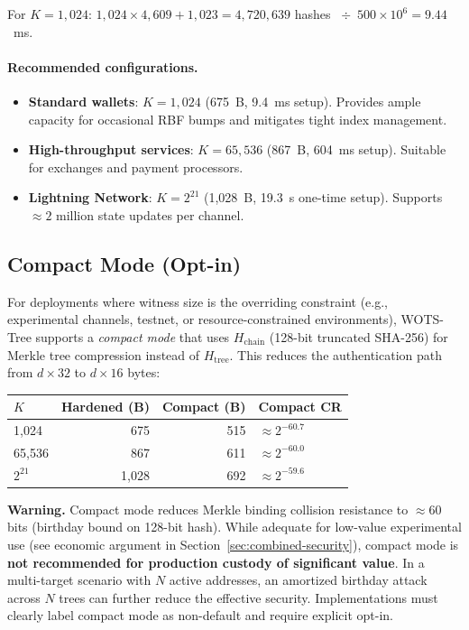 \documentclass[11pt,a4paper]{article}
\theoremstyle{definition}
\begin{document}
For $K = 1{,}024$: $1{,}024 \times 4{,}609 + 1{,}023 = 4{,}720{,}639$ hashes $\;\div\; 500 \times 10^6 = 9.44$~ms.

\paragraph{Recommended configurations.}
\begin{itemize}[nosep]
    \item \textbf{Standard wallets}: $K = 1{,}024$ (675~B, 9.4~ms setup). Provides ample capacity for occasional RBF bumps and mitigates tight index management.
    \item \textbf{High-throughput services}: $K = 65{,}536$ (867~B, 604~ms setup). Suitable for exchanges and payment processors.
    \item \textbf{Lightning Network}: $K = 2^{21}$ (1,028~B, 19.3~s one-time setup). Supports $\approx 2$ million state updates per channel.
\end{itemize}

\subsection{Compact Mode (Opt-in)}
\label{sec:compact-mode}

For deployments where witness size is the overriding constraint (e.g., experimental channels, testnet, or resource-constrained environments), WOTS-Tree supports a \emph{compact mode} that uses $H_{\mathrm{chain}}$ (128-bit truncated SHA-256) for Merkle tree compression instead of $H_{\mathrm{tree}}$. This reduces the authentication path from $d \times 32$ to $d \times 16$ bytes:

\begin{center}
\begin{tabular}{@{}lrrl@{}}
\toprule
$K$ & \textbf{Hardened (B)} & \textbf{Compact (B)} & \textbf{Compact CR} \\
\midrule
1,024 & 675 & 515 & $\approx 2^{-60.7}$ \\
65,536 & 867 & 611 & $\approx 2^{-60.0}$ \\
$2^{21}$ & 1,028 & 692 & $\approx 2^{-59.6}$ \\
\bottomrule
\end{tabular}
\end{center}

\noindent\textbf{Warning.} Compact mode reduces Merkle binding collision resistance to $\approx 60$ bits (birthday bound on 128-bit hash). While adequate for low-value experimental use (see economic argument in Section~\ref{sec:combined-security}), compact mode is \textbf{not recommended for production custody of significant value}. In a multi-target scenario with $N$ active addresses, an amortized birthday attack across $N$ trees can further reduce the effective security. Implementations must clearly label compact mode as non-default and require explicit opt-in.
\end{document}
